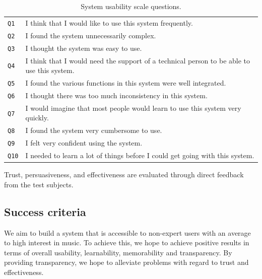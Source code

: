 \begin{table}
	\caption{System usability scale questions.}
	\begin{tabular}{ p{20px} | p{410px} }
		\hline
		\texttt{Q1} 	&	I think that I would like to use this system frequently. \\
		\texttt{Q2}		&	I found the system unnecessarily complex. \\
		\texttt{Q3}		&	I thought the system was easy to use. \\
		\texttt{Q4} 	&	I think that I would need the support of a technical person to be able to use this system. \\
		\texttt{Q5}		&	I found the various functions in this system were well integrated. \\
		\texttt{Q6}		&	I thought there was too much inconsistency in this system. \\
		\texttt{Q7} 	&	I would imagine that most people would learn to use this system very quickly.  \\
		\texttt{Q8}		&	I found the system very cumbersome to use. \\
		\texttt{Q9}		& I felt very confident using the system. \\
		\texttt{Q10}	& I needed to learn a lot of things before I could get going with this system. \\
		\hline
	\end{tabular}
	\label{table:sus_questions}
\end{table}

Trust, persuasiveness, and effectiveness are evaluated through direct feedback from the test subjects.


\subsection{Success criteria}\label{introduction:objective:criteria}

We aim to build a system that is accessible to non-expert users with an average to high interest in music. To achieve this, we hope to achieve positive results in terms of overall usability, learnability, memorability and transparency. By providing transparency, we hope to alleviate problems with regard to trust and effectiveness.






